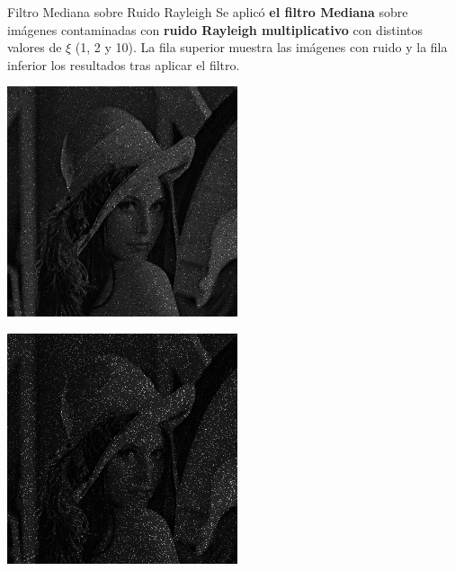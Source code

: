 \documentclass{beamer}
\begin{document}
\begin{frame}[fragile]{Filtro Mediana sobre Ruido Rayleigh}
	\justifying
	\footnotesize
	Se aplicó \textcolor{unahurverde}{\textbf{el filtro Mediana}} sobre imágenes contaminadas con \textcolor{unahurverde}{\textbf{ruido Rayleigh multiplicativo}}  
	con distintos valores de $\xi$ (1, 2 y 10).  
	La fila superior muestra las imágenes con ruido y la fila inferior los resultados tras aplicar el filtro.
	
	\centering
	\begin{minipage}{0.25\linewidth}
		\centering
		\includegraphics[width=\linewidth]{../results/lena_rayleigh_xi1}
	\end{minipage}\hfill
	\begin{minipage}{0.25\linewidth}
		\centering
		\includegraphics[width=\linewidth]{../results/lena_rayleigh_xi2}

\end{minipage}
\end{frame}
\end{document}
